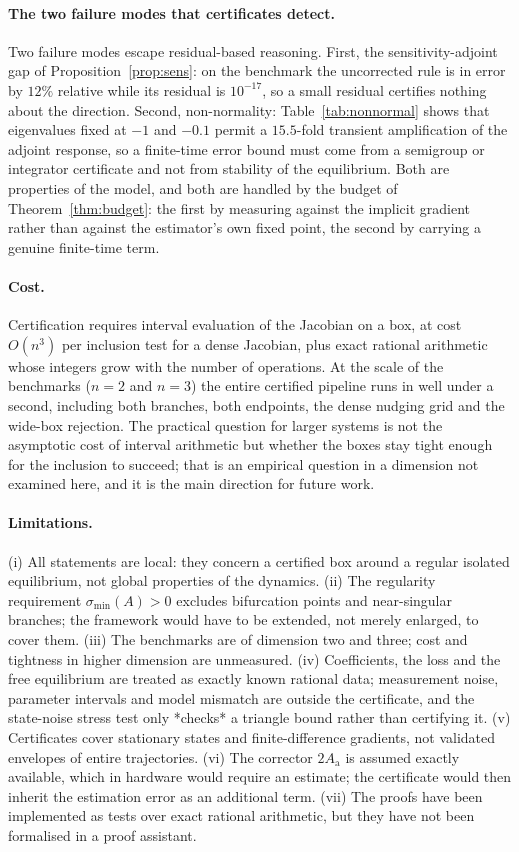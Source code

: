 \documentclass[11pt]{article}
\theoremstyle{definition}
\theoremstyle{remark}
\begin{document}
\paragraph{The two failure modes that certificates detect.}
Two failure modes escape residual-based reasoning. First, the sensitivity-adjoint gap of
Proposition~\ref{prop:sens}: on the benchmark the uncorrected rule is in error by $12\%$ relative
while its residual is $10^{-17}$, so a small residual certifies nothing about the direction.
Second, non-normality: Table~\ref{tab:nonnormal} shows that eigenvalues fixed at $-1$ and $-0.1$
permit a $15.5$-fold transient amplification of the adjoint response, so a finite-time error bound
must come from a semigroup or integrator certificate and not from stability of the equilibrium.
Both are properties of the model, and both are handled by the budget of
Theorem~\ref{thm:budget}: the first by measuring against the implicit gradient rather than against
the estimator's own fixed point, the second by carrying a genuine finite-time term.

\paragraph{Cost.}
Certification requires interval evaluation of the Jacobian on a box, at cost $O(n^3)$ per
inclusion test for a dense Jacobian, plus exact rational arithmetic whose integers grow with the
number of operations. At the scale of the benchmarks ($n = 2$ and $n = 3$) the entire certified
pipeline runs in well under a second, including both branches, both endpoints, the dense nudging
grid and the wide-box rejection. The practical question for larger systems is not the asymptotic
cost of interval arithmetic but whether the boxes stay tight enough for the inclusion to succeed;
that is an empirical question in a dimension not examined here, and it is the main direction for
future work.

\paragraph{Limitations.}
(i) All statements are local: they concern a certified box around a regular isolated equilibrium,
not global properties of the dynamics. (ii) The regularity requirement $\sigma_{\min}(A) > 0$
excludes bifurcation points and near-singular branches; the framework would have to be extended,
not merely enlarged, to cover them. (iii) The benchmarks are of dimension two and three; cost and
tightness in higher dimension are unmeasured. (iv) Coefficients, the loss and the free equilibrium
are treated as exactly known rational data; measurement noise, parameter intervals and model
mismatch are outside the certificate, and the state-noise stress test only *checks* a triangle
bound rather than certifying it. (v) Certificates cover stationary states and finite-difference
gradients, not validated envelopes of entire trajectories. (vi) The corrector $2A_{\mathrm a}$ is
assumed exactly available, which in hardware would require an estimate; the certificate would then
inherit the estimation error as an additional term. (vii) The proofs have been implemented as
tests over exact rational arithmetic, but they have not been formalised in a proof assistant.
\end{document}
